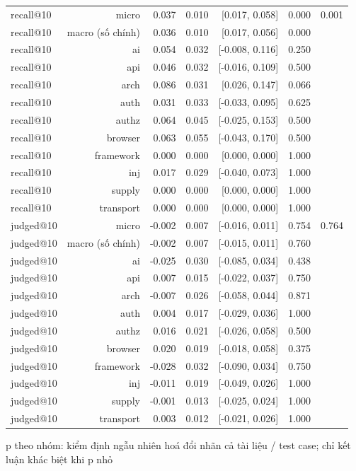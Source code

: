 \begin{table}[ht]
\begin{tabular}{lrrrrrr}
recall@10 & micro & 0.037 & 0.010 & [0.017, 0.058] & 0.000 & 0.001 \\
recall@10 & macro (số chính) & 0.036 & 0.010 & [0.017, 0.056] & 0.000 &  \\
recall@10 & ai & 0.054 & 0.032 & [-0.008, 0.116] & 0.250 &  \\
recall@10 & api & 0.046 & 0.032 & [-0.016, 0.109] & 0.500 &  \\
recall@10 & arch & 0.086 & 0.031 & [0.026, 0.147] & 0.066 &  \\
recall@10 & auth & 0.031 & 0.033 & [-0.033, 0.095] & 0.625 &  \\
recall@10 & authz & 0.064 & 0.045 & [-0.025, 0.153] & 0.500 &  \\
recall@10 & browser & 0.063 & 0.055 & [-0.043, 0.170] & 0.500 &  \\
recall@10 & framework & 0.000 & 0.000 & [0.000, 0.000] & 1.000 &  \\
recall@10 & inj & 0.017 & 0.029 & [-0.040, 0.073] & 1.000 &  \\
recall@10 & supply & 0.000 & 0.000 & [0.000, 0.000] & 1.000 &  \\
recall@10 & transport & 0.000 & 0.000 & [0.000, 0.000] & 1.000 &  \\
judged@10 & micro & -0.002 & 0.007 & [-0.016, 0.011] & 0.754 & 0.764 \\
judged@10 & macro (số chính) & -0.002 & 0.007 & [-0.015, 0.011] & 0.760 &  \\
judged@10 & ai & -0.025 & 0.030 & [-0.085, 0.034] & 0.438 &  \\
judged@10 & api & 0.007 & 0.015 & [-0.022, 0.037] & 0.750 &  \\
judged@10 & arch & -0.007 & 0.026 & [-0.058, 0.044] & 0.871 &  \\
judged@10 & auth & 0.004 & 0.017 & [-0.029, 0.036] & 1.000 &  \\
judged@10 & authz & 0.016 & 0.021 & [-0.026, 0.058] & 0.500 &  \\
judged@10 & browser & 0.020 & 0.019 & [-0.018, 0.058] & 0.375 &  \\
judged@10 & framework & -0.028 & 0.032 & [-0.090, 0.034] & 0.750 &  \\
judged@10 & inj & -0.011 & 0.019 & [-0.049, 0.026] & 1.000 &  \\
judged@10 & supply & -0.001 & 0.013 & [-0.025, 0.024] & 1.000 &  \\
judged@10 & transport & 0.003 & 0.012 & [-0.021, 0.026] & 1.000 &  \\
\bottomrule
\end{tabular}
\par\smallskip\footnotesize p theo nhóm: kiểm định ngẫu nhiên hoá đổi nhãn cả tài liệu / test case; chỉ kết luận khác biệt khi p nhỏ
\end{table}

